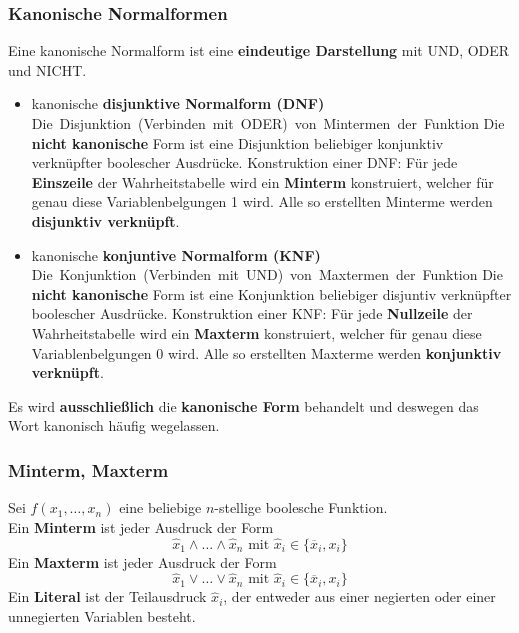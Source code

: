 \documentclass[12pt]{article}
\begin{document}
\subsubsection{Kanonische Normalformen}
Eine kanonische Normalform ist eine \textbf{eindeutige Darstellung} mit UND, ODER und NICHT. \\
\begin{itemize}
    \item kanonische \textbf{disjunktive Normalform (DNF)}
        \subitem \hbox{Die Disjunktion (Verbinden mit ODER) von Mintermen der Funktion}
        \subitem \vbox{Die \textbf{nicht kanonische} Form ist eine Disjunktion beliebiger konjunktiv \\ verknüpfter boolescher Ausdrücke.}
        \subitem \vbox{Konstruktion einer DNF: Für jede \textbf{Einszeile} der Wahrheitstabelle wird ein \textbf{Minterm} konstruiert, welcher für genau diese Variablenbelgungen 1 wird. Alle so erstellten Minterme werden \textbf{disjunktiv verknüpft}.}
    \item kanonische \textbf{konjuntive Normalform (KNF)}
        \subitem \hbox{Die Konjunktion (Verbinden mit UND) von Maxtermen der Funktion}
        \subitem \vbox{Die \textbf{nicht kanonische} Form ist eine Konjunktion beliebiger disjuntiv verknüpfter boolescher Ausdrücke.}
        \subitem \vbox{Konstruktion einer KNF: Für jede \textbf{Nullzeile} der Wahrheitstabelle wird ein \textbf{Maxterm} konstruiert, welcher für genau diese Variablenbelgungen 0 wird. Alle so erstellten Maxterme werden \textbf{konjunktiv verknüpft}.}
\end{itemize}
Es wird \textbf{ausschließlich} die \textbf{kanonische Form} behandelt und deswegen das Wort kanonisch häufig wegelassen.
\subsubsection{Minterm, Maxterm}
Sei $f(x_1, \dots, x_n)$ eine beliebige $n$-stellige boolesche Funktion. \\
Ein \textbf{Minterm} ist jeder Ausdruck der Form
\[\hat{x}_1 \land \dots \land \hat{x}_n \text{ mit } \hat{x}_i \in \{\overline{x}_i, x_i\}\]
Ein \textbf{Maxterm} ist jeder Ausdruck der Form
\[\hat{x}_1 \lor \dots \lor \hat{x}_n \text{ mit } \hat{x}_i \in \{\overline{x}_i, x_i\}\]
Ein \textbf{Literal} ist der Teilausdruck $\hat{x}_i$, der entweder aus einer negierten oder einer unnegierten Variablen besteht.
\end{document}

